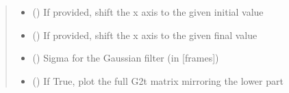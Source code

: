 \documentclass[letterpaper,10pt,english]{sphinxmanual}
\begin{document}
\begin{fulllineitems}
\begin{quote}
\begin{description}
\begin{itemize}
\item {} 
\sphinxAtStartPar
{} () \textendash{} If provided, shift the x axis to the given initial value

\item {} 
\sphinxAtStartPar
{} () \textendash{} If provided, shift the x axis to the given final value

\item {} 
\sphinxAtStartPar
{} () \textendash{} Sigma for the Gaussian filter (in {[}frames{]})

\item {} 
\sphinxAtStartPar
{} () \textendash{} If True, plot the full G2t matrix mirroring the lower part

\end{itemize}

\end{description}\end{quote}

\end{fulllineitems}

\end{document}
